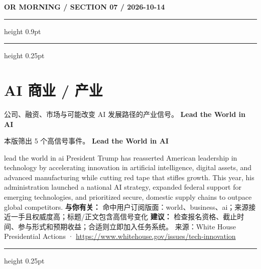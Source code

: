 \documentclass[10.5pt]{ctexart}
\begin{document}
\newpage
{\small\bfseries OR MORNING / SECTION 07 / 2026-10-14}
\vspace{2mm}
\hrule height 0.9pt
\vspace{1.5mm}
\hrule height 0.25pt
\vspace{4mm}
\section*{AI 商业 / 产业}
{\color{ormuted} 公司、融资、市场与可能改变 AI 发展路径的产业信号。}
\vspace{2mm}
{\LARGE\bfseries Lead the World in AI}\par
\vspace{1mm}
{\color{ormuted} 本版筛出 5 个高信号事件。}
\vspace{3mm}
{\Large\bfseries Lead the World in AI}\par
lead the world in ai President Trump has reasserted American leadership in technology by accelerating innovation in artificial intelligence, digital assets, and advanced manufacturing while cutting red tape that stifles growth. This year, his administration launched a national AI strategy, expanded federal support for emerging technologies, and prioritized secure, domestic supply chains to outpace global competitors.
\textbf{与你有关：} 命中用户订阅版面：world、business、ai；来源接近一手且权威度高；标题/正文包含高信号变化
\textbf{建议：} 检查报名资格、截止时间、参与形式和预期收益；合适则立即加入任务系统。
{\footnotesize\color{ormuted} 来源：White House Presidential Actions · \url{https://www.whitehouse.gov/issues/tech-innovation}}
\vspace{4mm}
\hrule height 0.25pt
\vspace{3mm}
\end{document}
